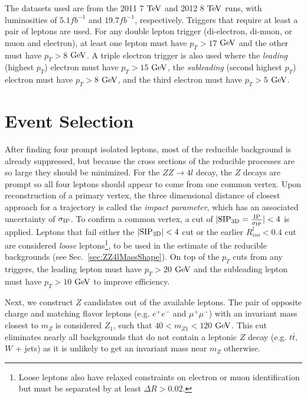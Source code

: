 The datasets used are from the 2011 $7$ $\rm{TeV}$ and 2012 $8$ $\rm{TeV}$ runs, with luminosities of $5.1 fb^{-1}$ and $19.7 fb^{-1}$, respectively. Triggers that require at least a pair of leptons are used. For any double lepton trigger (di-electron, di-muon, or muon and electron), at least one lepton must have $p_T>17$ $\rm{GeV}$ and the other must have $p_T>8$ $\rm{GeV}$. A triple electron trigger is also used where the \textit{leading} (highest $p_T$) electron must have $p_T>15$ $\rm{GeV}$, the \textit{subleading} (second highest $p_T$) electron must have $p_T>8$ $\rm{GeV}$, and the third electron must have $p_T>5$ $\rm{GeV}$.

\section{Event Selection}
\label{sec:ZZ4lSelection}

After finding four prompt isolated leptons, most of the reducible background is already suppressed, but because the cross sections of the reducible processes are so large they should be minimized. For the $ZZ \rightarrow 4l$ decay, the $Z$ decays are prompt so all four leptons should appear to come from one common vertex. Upon reconstruction of a primary vertex, the three dimensional distance of closest approach for a trajectory is called the \textit{impact parameter}, which has an associated uncertainty of $\sigma_{\rm{IP}}$. To confirm a common vertex, a cut of $|\rm{SIP_{3D}}=\frac{\rm{IP}}{\sigma_{\rm{IP}}}|<4$ is applied. Leptons that fail either the $|\rm{SIP_{3D}}|<4$ cut or the earlier $R_{iso}^l<0.4$ cut are considered \textit{loose} leptons\footnote{Loose leptons also have relaxed constraints on electron or muon identification but must be separated by at least $\Delta R>0.02$.}, to be used in the estimate of the reducible backgrounds (see Sec.~\ref{sec:ZZ4lMassShape}). On top of the $p_T$ cuts from any triggers, the leading lepton must have $p_T > 20$  $\rm{GeV}$ and the subleading lepton must have $p_T > 10$ $\rm{GeV}$ to improve efficiency.

Next, we construct $Z$ candidates out of the available leptons. The pair of opposite charge and matching flavor leptons (e.g. $e^+e^-$ and $\mu^+\mu^-$) with an invariant mass closest to $m_Z$ is considered $Z_1$, such that $40< m_{Z1} < 120$ $\rm{GeV}$. This cut eliminates nearly all backgrounds that do not contain a leptonic $Z$ decay (e.g. $t\bar{t}$, $W$ + jets) as it is unlikely to get an invariant mass near $m_Z$ otherwise.

